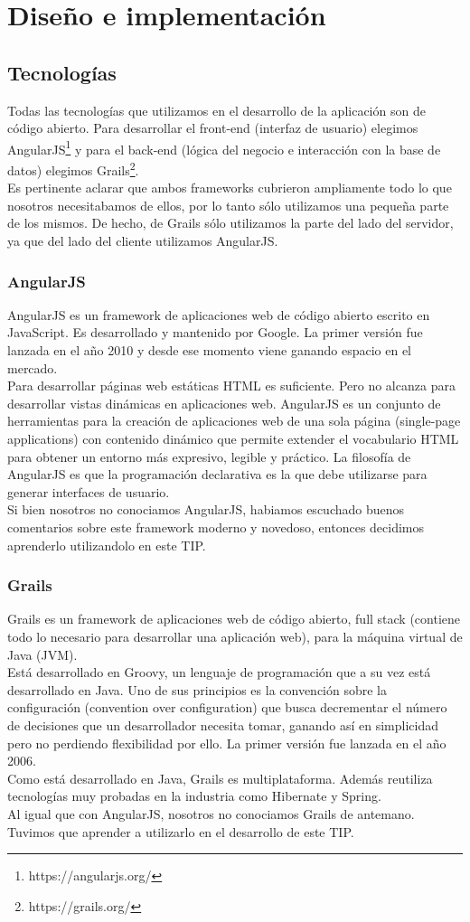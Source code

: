 \section{Diseño e implementación}
\subsection{Tecnologías}
Todas las tecnologías que utilizamos en el desarrollo de la aplicación son de código abierto. Para desarrollar el front-end (interfaz de usuario) elegimos AngularJS\footnote{https://angularjs.org/} y para el back-end (lógica del negocio e interacción con la base de datos) elegimos Grails\footnote{https://grails.org/}.\\
Es pertinente aclarar que ambos frameworks cubrieron ampliamente todo lo que nosotros necesitabamos de ellos, por lo tanto sólo utilizamos una pequeña parte de los mismos. De hecho, de Grails sólo utilizamos la parte del lado del servidor, ya que del lado del cliente utilizamos AngularJS.
\subsubsection{AngularJS}
AngularJS es un framework de aplicaciones web de código abierto escrito en JavaScript. Es desarrollado y mantenido por Google. La primer versión fue lanzada en el año 2010 y desde ese momento viene ganando espacio en el mercado.\\
Para desarrollar páginas web estáticas HTML es suficiente. Pero no alcanza para desarrollar vistas dinámicas en aplicaciones web. AngularJS es un conjunto de herramientas para la creación de aplicaciones web de una sola página (single-page applications) con contenido dinámico que permite extender el vocabulario HTML para obtener un entorno más expresivo, legible y práctico. La filosofía de AngularJS es que la programación declarativa es la que debe utilizarse para generar interfaces de usuario.\\
Si bien nosotros no conociamos AngularJS, habiamos escuchado buenos comentarios sobre este framework moderno y novedoso, entonces decidimos aprenderlo utilizandolo en este TIP.
\subsubsection{Grails}
Grails es un framework de aplicaciones web de código abierto, full stack (contiene todo lo necesario para desarrollar una aplicación web), para la máquina virtual de Java (JVM).\\
Está desarrollado en Groovy, un lenguaje de programación que a su vez está desarrollado en Java. Uno de sus principios es la convención sobre la configuración (convention over configuration) que busca decrementar el número de decisiones que un desarrollador necesita tomar, ganando así en simplicidad pero no perdiendo flexibilidad por ello. La primer versión fue lanzada en el año 2006.\\
Como está desarrollado en Java, Grails es multiplataforma. Además reutiliza tecnologías muy probadas en la industria como Hibernate y Spring.\\
Al igual que con AngularJS, nosotros no conociamos Grails de antemano. Tuvimos que aprender a utilizarlo en el desarrollo de este TIP.

